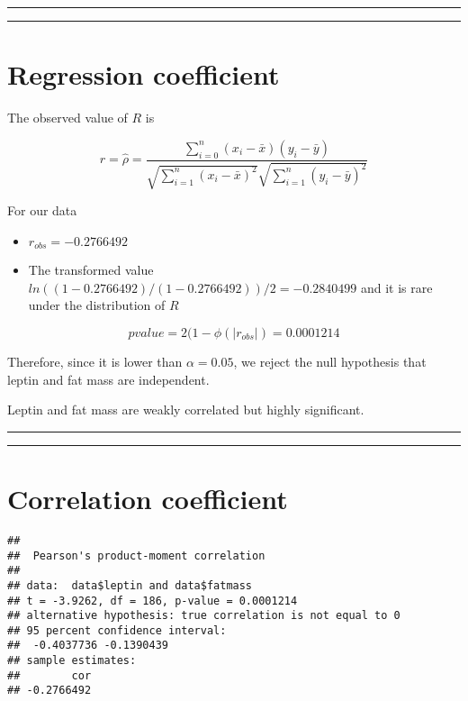 \documentclass[
]{book}
\begin{document}
\begin{center}\rule{0.5\linewidth}{0.5pt}\end{center}

\begin{center}\rule{0.5\linewidth}{0.5pt}\end{center}

\hypertarget{regression-coefficient}{%
\section{Regression coefficient}\label{regression-coefficient}}

The observed value of \(R\) is

\[r=\hat{\rho}=\frac{\sum_{i=0}^n(x_i-\bar{x})(y_i-\bar{y})}{\sqrt{\sum_{i=1}^n(x_i-\bar{x})^2}\sqrt{\sum_{i=1}^n(y_i-\bar{y})^2}}\]

For our data

\begin{itemize}
\item
  \(r_{obs}=-0.2766492\)
\item
  The transformed value \(ln((1-0.2766492)/(1-0.2766492))/2=-0.2840499\) and it is rare under the distribution of \(R\)
\end{itemize}

\[pvalue=2(1- \phi(|r_{obs}|)=0.0001214\]

Therefore, since it is lower than \(\alpha=0.05\), we reject the null hypothesis that leptin and fat mass are independent.

Leptin and fat mass are weakly correlated but highly significant.

\begin{center}\rule{0.5\linewidth}{0.5pt}\end{center}

\begin{center}\rule{0.5\linewidth}{0.5pt}\end{center}

\hypertarget{correlation-coefficient-1}{%
\section{Correlation coefficient}\label{correlation-coefficient-1}}

\begin{verbatim}
## 
##  Pearson's product-moment correlation
## 
## data:  data$leptin and data$fatmass
## t = -3.9262, df = 186, p-value = 0.0001214
## alternative hypothesis: true correlation is not equal to 0
## 95 percent confidence interval:
##  -0.4037736 -0.1390439
## sample estimates:
##        cor 
## -0.2766492
\end{verbatim}
\end{document}
